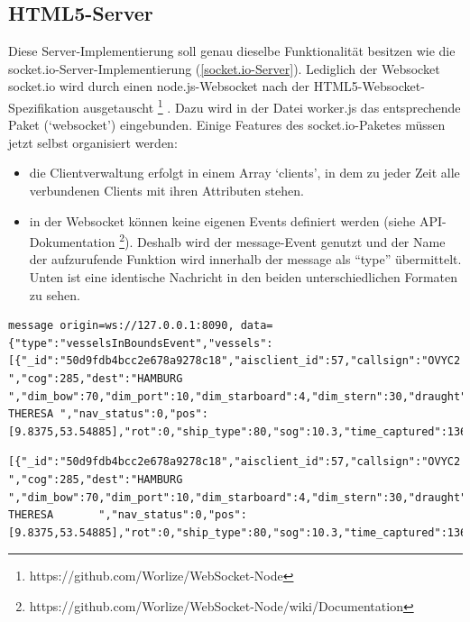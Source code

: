 \subsection{HTML5-Server}\label{HTML5-Server}
Diese Server-Implementierung soll genau dieselbe Funktionalität besitzen wie die socket.io-Server-Implementierung (\ref{socket.io-Server}). Lediglich der Websocket socket.io wird durch einen node.js-Websocket nach der HTML5-Websocket-Spezifikation ausgetauscht \footnote{https://github.com/Worlize/WebSocket-Node} . Dazu wird in der Datei worker.js das entsprechende Paket (‘websocket’) eingebunden.
Einige Features des socket.io-Paketes müssen jetzt selbst organisiert werden: 
\begin{itemize}
\item die Clientverwaltung erfolgt in einem Array ‘clients’, in dem zu jeder Zeit alle verbundenen Clients mit ihren Attributen stehen. 
\item in der Websocket können keine eigenen Events definiert werden (siehe API-Dokumentation \footnote{https://github.com/Worlize/WebSocket-Node/wiki/Documentation}). Deshalb wird der message-Event genutzt und der Name der aufzurufende Funktion wird innerhalb der message als “type” übermittelt. Unten ist eine identische Nachricht in den beiden unterschiedlichen Formaten zu sehen.
\end{itemize}
\begin{lstlisting}[caption= vom Websocket-Server gesendete message, label=websocket-message]
message origin=ws://127.0.0.1:8090, data={"type":"vesselsInBoundsEvent","vessels":[{"_id":"50d9fdb4bcc2e678a9278c18","aisclient_id":57,"callsign":"OVYC2 ","cog":285,"dest":"HAMBURG ","dim_bow":70,"dim_port":10,"dim_starboard":4,"dim_stern":30,"draught":54,"imo":"9363170","mmsi":220515000,"msgid":1,"name":"RIKKE THERESA ","nav_status":0,"pos":[9.8375,53.54885],"rot":0,"ship_type":80,"sog":10.3,"time_captured":1366733896000,"time_received":1366733855248,"true_heading":286}]}

\end{lstlisting}
\begin{lstlisting}[caption= vom socket.io-Server gesendete message, label=socket.io-message]
[{"_id":"50d9fdb4bcc2e678a9278c18","aisclient_id":57,"callsign":"OVYC2  ","cog":285,"dest":"HAMBURG             ","dim_bow":70,"dim_port":10,"dim_starboard":4,"dim_stern":30,"draught":54,"imo":"9363170","mmsi":220515000,"msgid":1,"name":"RIKKE THERESA       ","nav_status":0,"pos":[9.8375,53.54885],"rot":0,"ship_type":80,"sog":10.3,"time_captured":1366734056000,"time_received":1366733855248,"true_heading":286}]
\end{lstlisting}
